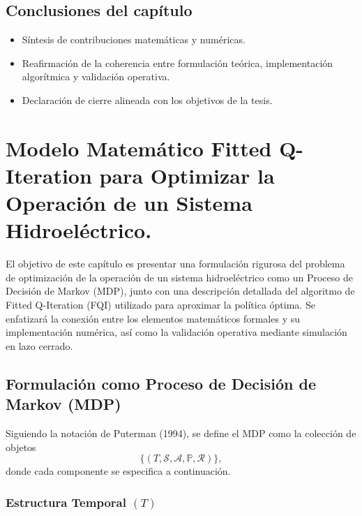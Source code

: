 \documentclass[
  letterpaper,
  DIV=11,
  numbers=noendperiod]{scrreprt}
\providecommand{\tightlist}{%
  \setlength{\itemsep}{0pt}\setlength{\parskip}{0pt}}
\theoremstyle{definition}
\theoremstyle{remark}
\begin{document}
\section{Conclusiones del capítulo}\label{conclusiones-del-capuxedtulo}

\begin{itemize}
\tightlist
\item
  Síntesis de contribuciones matemáticas y numéricas.
\item
  Reafirmación de la coherencia entre formulación teórica,
  implementación algorítmica y validación operativa.
\item
  Declaración de cierre alineada con los objetivos de la tesis.
\end{itemize}

\chapter{Modelo Matemático Fitted Q-Iteration para Optimizar la
Operación de un Sistema
Hidroeléctrico.}\label{modelo-matemuxe1tico-fitted-q-iteration-para-optimizar-la-operaciuxf3n-de-un-sistema-hidroeluxe9ctrico.}

El objetivo de este capítulo es presentar una formulación rigurosa del
problema de optimización de la operación de un sistema hidroeléctrico
como un Proceso de Decisión de Markov (MDP), junto con una descripción
detallada del algoritmo de Fitted Q-Iteration (FQI) utilizado para
aproximar la política óptima. Se enfatizará la conexión entre los
elementos matemáticos formales y su implementación numérica, así como la
validación operativa mediante simulación en lazo cerrado.

\section{Formulación como Proceso de Decisión de Markov
(MDP)}\label{formulaciuxf3n-como-proceso-de-decisiuxf3n-de-markov-mdp}

Siguiendo la notación de Puterman (1994), se define el MDP como la
colección de objetos
\[\{(T, \mathcal{S}, \mathcal{A}, \mathbb{P}, \mathcal{R})\},\] donde
cada componente se especifica a continuación.

\subsection{\texorpdfstring{Estructura Temporal
\((T)\)}{Estructura Temporal (T)}}\label{estructura-temporal-t}
\end{document}
